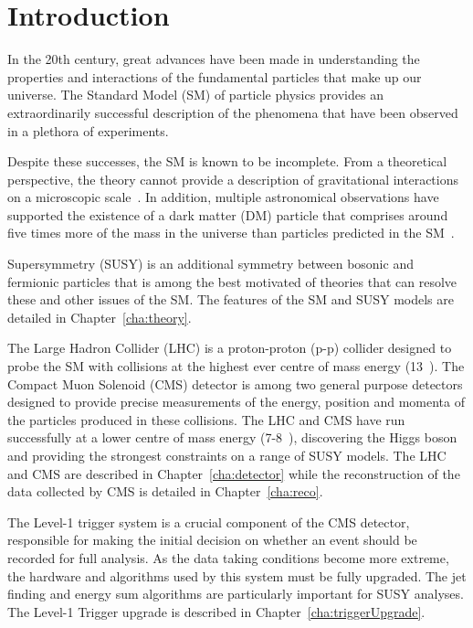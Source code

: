 \chapter{Introduction}
\label{cha:introduction}

In the 20th century, great advances have been made in
understanding the properties and interactions of 
the fundamental particles that make up our universe. 
The Standard Model (SM) of particle physics provides an 
extraordinarily successful description of the phenomena 
that have been observed in a plethora of experiments.

Despite these successes, the SM is known to be incomplete.
From a theoretical perspective, the theory cannot provide a description of gravitational
interactions on a microscopic scale~\cite{gravRenorm}. In addition, multiple astronomical observations 
have supported the existence of a dark matter (DM) particle that
comprises around five times more of the mass in the universe than particles 
predicted in the SM~\cite{WIMP}.

Supersymmetry (SUSY) is an additional symmetry between bosonic and fermionic particles 
that is among the best motivated of theories that can resolve these
and other issues of the SM. The features of the SM and SUSY models are detailed 
in Chapter~\ref{cha:theory}. 

The Large Hadron Collider (LHC) is a proton-proton (p-p) collider designed to probe the 
SM with collisions at the highest ever centre of mass energy (13~\TeV).
The Compact Muon Solenoid (CMS) detector is among two general purpose detectors
designed to provide precise measurements of the energy, position and momenta of
the particles produced in these collisions. The LHC and CMS have run successfully at a lower centre of 
mass energy (7-8~\TeV), discovering the Higgs boson and providing the strongest 
constraints on a range of SUSY models. The LHC and CMS are described in Chapter~\ref{cha:detector}
while the reconstruction of the data collected by CMS is detailed in Chapter~\ref{cha:reco}.

The Level-1 trigger system is a crucial component of the CMS detector, responsible 
for making the initial decision on whether an event should be recorded 
for full analysis. As the data taking conditions become more extreme, the hardware
and algorithms used by this system must be fully upgraded. The jet finding and energy sum algorithms 
are particularly important for SUSY analyses. The Level-1 Trigger upgrade is described in 
Chapter~\ref{cha:triggerUpgrade}. 

